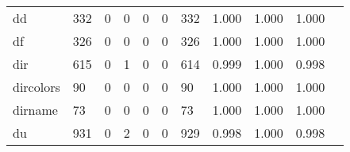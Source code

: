 \begin{longtable}{lp{1.2cm}p{1.2cm}p{1.2cm}p{1.2cm}p{1.2cm}p{1.2cm}p{1.2cm}p{1.2cm}p{1.2cm}p{1.2cm}}
dd        &                                   332 &                                                  0 &                                                  0 &                                                  0 &                                                  0 &                                                332 &                                         1.000 &                                              1.000 &                                              1.000 \\
df        &                                   326 &                                                  0 &                                                  0 &                                                  0 &                                                  0 &                                                326 &                                         1.000 &                                              1.000 &                                              1.000 \\
dir       &                                   615 &                                                  0 &                                                  1 &                                                  0 &                                                  0 &                                                614 &                                         0.999 &                                              1.000 &                                              0.998 \\
dircolors &                                    90 &                                                  0 &                                                  0 &                                                  0 &                                                  0 &                                                 90 &                                         1.000 &                                              1.000 &                                              1.000 \\
dirname   &                                    73 &                                                  0 &                                                  0 &                                                  0 &                                                  0 &                                                 73 &                                         1.000 &                                              1.000 &                                              1.000 \\
du        &                                   931 &                                                  0 &                                                  2 &                                                  0 &                                                  0 &                                                929 &                                         0.998 &                                              1.000 &                                              0.998 \\

\end{longtable}
